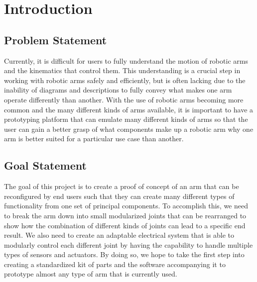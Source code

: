 

\section{Introduction} 

\subsection{Problem Statement}
\noindent Currently, it is difficult for users to fully understand the motion of robotic arms and the kinematics that control them. This understanding is a crucial step in working with robotic arms safely and efficiently, but is often lacking due to the inability of diagrams and descriptions to fully convey what makes one arm operate differently than another. With the use of robotic arms becoming more common and the many different kinds of arms available, it is important to have a prototyping platform that can emulate many different kinds of arms so that the user can gain a better grasp of what components make up a robotic arm why one arm is better suited for a particular use case than another.

\subsection{Goal Statement}
The goal of this project is to create a proof of concept of an arm that can be reconfigured by end users such that they can create many different types of functionality from one set of principal components. To accomplish this, we need to break the arm down into small modularized joints that can be rearranged to show how the combination of different kinds of joints can lead to a specific end result. We also need to create an adaptable electrical system that is able to modularly control each different joint by having the capability to handle multiple types of sensors and actuators. By doing so, we hope to take the first step into creating a standardized kit of parts and the software accompanying it to prototype almost any type of arm that is currently used. 

